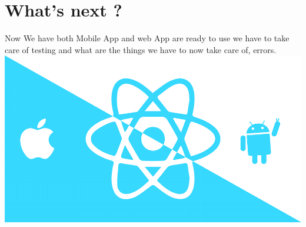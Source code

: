 \section{What's next ?}
Now We have both Mobile App and web App are ready to use we have to take care of testing and what are the things we have to now take care of, errors.\\

\includegraphics[width=1\textwidth]{images/reactnative.png}\\
